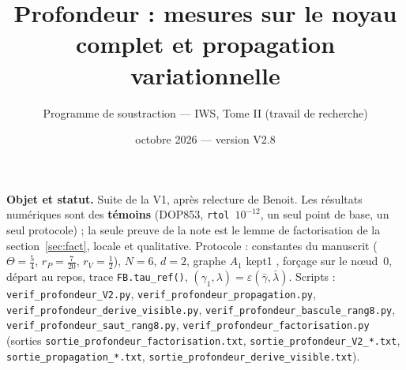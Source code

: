 \documentclass[11pt,a4paper]{article}
\title{Profondeur : mesures sur le noyau complet et propagation variationnelle}
\author{Programme de soustraction --- IWS, Tome II (travail de recherche)}
\date{octobre 2026 --- version V2.8}
\theoremstyle{remark}
\begin{document}
\maketitle

\noindent\textbf{Objet et statut.} Suite de la V1, apr\`es relecture de Benoit. Les r\'esultats num\'eriques sont des \textbf{t\'emoins} (DOP853, \texttt{rtol}~$10^{-12}$, un seul point de base, un seul protocole) ; la seule preuve de la note est le lemme de factorisation de la section~\ref{sec:fact}, locale et qualitative. Protocole : constantes du manuscrit ($\Theta=\frac54$, $r_P=\frac7{20}$, $r_V=\frac12$), $N=6$, $d=2$, graphe $A_1$ \og kept1 \fg, for\c{c}age sur le n\oe ud~0, d\'epart au repos, trace \texttt{FB.tau\_ref()}, $(\gamma_1,\lambda)=\varepsilon(\bar\gamma,\bar\lambda)$. Scripts : \texttt{verif\_profondeur\_V2.py}, \texttt{verif\_profondeur\_propagation.py}, \texttt{verif\_profondeur\_derive\_visible.py}, \texttt{verif\_profondeur\_bascule\_rang8.py}, \texttt{verif\_profondeur\_saut\_rang8.py}, \texttt{verif\_profondeur\_factorisation.py} (sorties \texttt{sortie\_profondeur\_factorisation.txt},  \texttt{sortie\_profondeur\_V2\_*.txt}, \texttt{sortie\_propagation\_*.txt}, \texttt{sortie\_profondeur\_derive\_visible.txt}).
\end{document}
